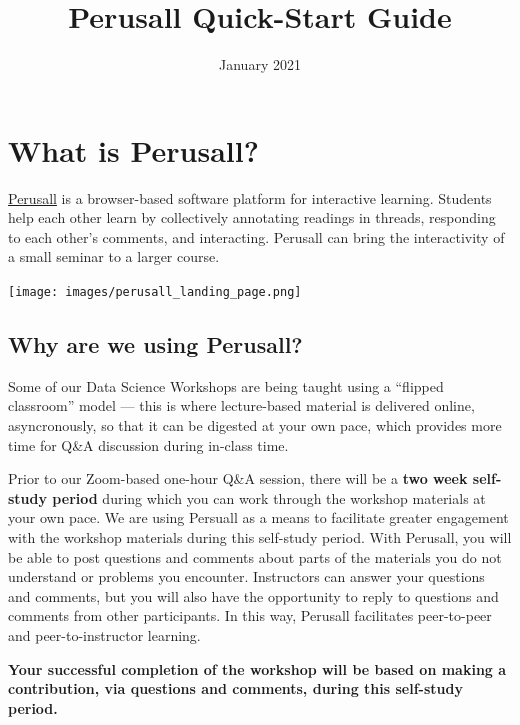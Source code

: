 \documentclass[]{book}
\title{Perusall Quick-Start Guide}
\author{}
\date{\vspace{-2.5em}January 2021}
\begin{document}
\maketitle

{
\setcounter{tocdepth}{1}
\tableofcontents
}
\hypertarget{what-is-perusall}{%
\chapter*{What is Perusall?}\label{what-is-perusall}}

\href{https://perusall.com/}{Perusall} is a browser-based software platform for interactive learning. Students help each other learn by collectively annotating readings in threads, responding to each other's comments, and interacting. Perusall can bring the interactivity of a small seminar to a larger course.

\texttt{[image: images/perusall\_landing\_page.png]}

\hypertarget{why-are-we-using-perusall}{%
\section*{Why are we using Perusall?}\label{why-are-we-using-perusall}}

Some of our Data Science Workshops are being taught using a ``flipped classroom'' model --- this is where lecture-based material is delivered online, asyncronously, so that it can be digested at your own pace, which provides more time for Q\&A discussion during in-class time.

Prior to our Zoom-based one-hour Q\&A session, there will be a \textbf{two week self-study period} during which you can work through the workshop materials at your own pace. We are using Persuall as a means to facilitate greater engagement with the workshop materials during this self-study period. With Perusall, you will be able to post questions and comments about parts of the materials you do not understand or problems you encounter. Instructors can answer your questions and comments, but you will also have the opportunity to reply to questions and comments from other participants. In this way, Perusall facilitates peer-to-peer and peer-to-instructor learning.

\textbf{Your successful completion of the workshop will be based on making a contribution, via questions and comments, during this self-study period.}
\end{document}
